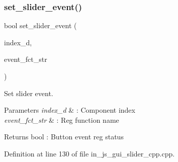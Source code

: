 \subsubsection{set\_slider\_event()}
{\footnotesize\ttfamily bool set\+\_\+slider\+\_\+event (\begin{DoxyParamCaption}\item[{double}]{index\+\_\+d,  }\item[{wx\+String}]{event\+\_\+fct\+\_\+str }\end{DoxyParamCaption})}



Set slider event. 


\begin{DoxyParams}{Parameters}
{\em index\+\_\+d} & \+: Component index \\
\hline
{\em event\+\_\+fct\+\_\+str} & \+: Reg function name \\
\hline
\end{DoxyParams}
\begin{DoxyReturn}{Returns}
bool \+: Button event reg status 
\end{DoxyReturn}


Definition at line 130 of file in\+\_\+js\+\_\+gui\+\_\+slider\+\_\+cpp.\+cpp.

